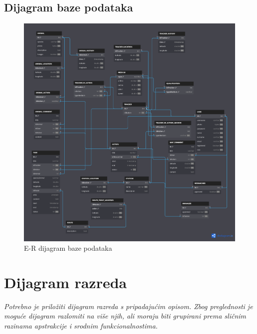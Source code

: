 			\fi			
										
			
			\subsection{Dijagram baze podataka}			
			
				\vspace{12pt}						
				
				\begin{figure}[H] %
					\centering
					\includegraphics[width=\textwidth]{slike/baza.PNG}
					\caption{E-R dijagram baze podataka}
					\label{fig:ERdiagram}
				\end{figure}																												
																																	
			\eject
						
			
			
		\section{Dijagram razreda}
		
		\iffalse	\textit{Potrebno je priložiti dijagram razreda s pripadajućim opisom. Zbog preglednosti je moguće dijagram razlomiti na više njih, ali moraju biti grupirani prema sličnim razinama apstrakcije i srodnim funkcionalnostima.}\\
			
